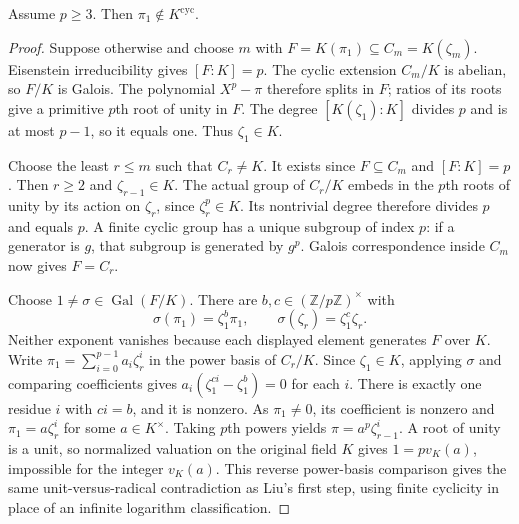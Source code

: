\begin{lemma}
\label{ft:first-radical-not-cyclotomic}
\leanok
Assume $p\geq3$. Then $\pi_1\notin K^{\mathrm{cyc}}$.
\end{lemma}
\begin{proof}
Suppose otherwise and choose $m$ with
$F=K(\pi_1)\subseteq C_m=K(\zeta_m)$.
Eisenstein irreducibility gives $[F:K]=p$.
The cyclic extension $C_m/K$ is abelian, so $F/K$ is Galois.
The polynomial $X^p-\pi$ therefore splits in $F$; ratios of its
roots give a primitive $p$th root of unity in $F$.
The degree $[K(\zeta_1):K]$ divides $p$ and is at most $p-1$,
so it equals one. Thus $\zeta_1\in K$.

Choose the least $r\leq m$ such that $C_r\ne K$.
It exists since $F\subseteq C_m$ and $[F:K]=p$.
Then $r\geq2$ and $\zeta_{r-1}\in K$.
The actual group of $C_r/K$ embeds in the $p$th roots of unity
by its action on $\zeta_r$, since $\zeta_r^p\in K$.
Its nontrivial degree therefore divides $p$ and equals $p$.
A finite cyclic group has a unique subgroup of index $p$:
if a generator is $g$, that subgroup is generated by $g^p$.
Galois correspondence inside $C_m$ now gives $F=C_r$.

Choose $1\ne\sigma\in\operatorname{Gal}(F/K)$.
There are $b,c\in(\mathbb Z/p\mathbb Z)^\times$ with
\[
 \sigma(\pi_1)=\zeta_1^b\pi_1,\qquad
 \sigma(\zeta_r)=\zeta_1^c\zeta_r.
\]
Neither exponent vanishes because each displayed element generates
$F$ over $K$. Write
$\pi_1=\sum_{i=0}^{p-1}a_i\zeta_r^i$ in the power basis of $C_r/K$.
Since $\zeta_1\in K$, applying $\sigma$ and comparing coefficients
gives $a_i(\zeta_1^{ci}-\zeta_1^b)=0$ for each $i$.
There is exactly one residue $i$ with $ci=b$, and it is nonzero.
As $\pi_1\ne0$, its coefficient is nonzero and
$\pi_1=a\zeta_r^i$ for some $a\in K^\times$.
Taking $p$th powers yields
$\pi=a^p\zeta_{r-1}^i$. A root of unity is a unit, so normalized
valuation on the original field $K$ gives $1=pv_K(a)$, impossible
for the integer $v_K(a)$.
This reverse power-basis comparison gives the same unit-versus-radical
contradiction as Liu's first step, using finite cyclicity in place
of an infinite logarithm classification.
\end{proof}

